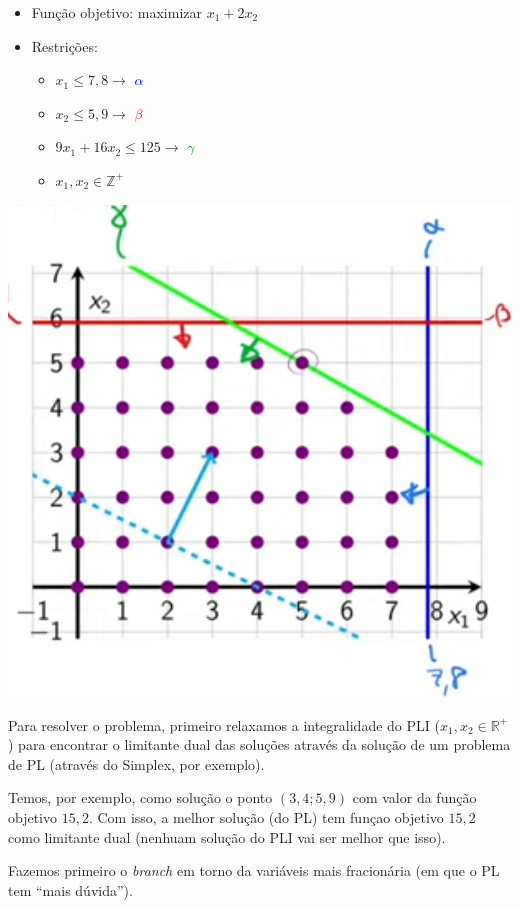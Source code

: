 \begin{multicols}{2}
    \begin{itemize}
        \item Função objetivo: maximizar $x_1+2x_2$
        \item Restrições:
        \begin{itemize}
            \item $x_1 \leq 7,8\to$ \textcolor{blue}{$\alpha$}
            \item $x_2 \leq 5,9\to$ \textcolor{red}{$\beta$}
            \item $9x_1+16x_2\leq125\to$ \textcolor{green}{$\gamma$}
            \item $x_1,x_2\in\mathbb{Z}^+$
        \end{itemize}
    \end{itemize}

    \columnbreak

    \includegraphics[width=.45\textwidth]{img/ex_branch_bound_1.png}
\end{multicols}

Para resolver o problema, primeiro relaxamos a integralidade do PLI ($x_1,x_2\in\mathbb{R}^+$) para encontrar o limitante dual das soluções através da solução de um problema de PL (através do Simplex, por exemplo).

Temos, por exemplo, como solução o ponto $(3,4; 5,9)$ com valor da função objetivo $15,2$. Com isso, a melhor solução (do PL) tem funçao objetivo $15,2$ como limitante dual (nenhuam solução do PLI vai ser melhor que isso).

Fazemos primeiro o \textit{branch} em torno da variáveis mais fracionária (em que o PL tem ``mais dúvida'').

\begin{center}
\end{center}

